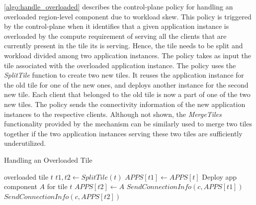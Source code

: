\cref{algo:handle_overloaded} describes the control-plane policy for handling an overloaded region-level component due to workload skew. This policy is triggered by the control-plane when it identifies that a given application instance is overloaded by the compute requirement of serving all the clients that are currently present in the tile its is serving. Hence, the tile needs to be split and workload divided among two application instances. The policy takes as input the tile associated with the overloaded application instance. The policy uses the \textit{SplitTile} function to create two new tiles. It reuses the application instance for the old tile for one of the new ones, and deploys another instance for the second new tile. Each client that belonged to the old tile is now a part of one of the two new tiles. The policy sends the connectivity information of the new application instances to the respective clients. Although not shown, the \textit{MergeTiles} functionality provided by the mechanism can be similarly used to merge two tiles together if the two application instances serving these two tiles are sufficiently underutilized.
\begin{algorithm}
\caption{Handling an Overloaded Tile}
\begin{algorithmic}
\Require overloaded tile $t$
\State $t1, t2 \gets SplitTile \left( t \right)$
\State $APPS \left[ t1 \right] \gets APPS \left[ t \right]$
\State Deploy app component $A$ for tile $t$
\State $APPS  \left[ t2 \right] \gets A$
    \State $SendConnectionInfo \left(c, APPS \left[ t1 \right] \right)$
\EndFor
{}
    \State $SendConnectionInfo \left(c, APPS \left[ t2 \right] \right)$
\EndFor
\end{algorithmic}
\label{algo:handle_overloaded}
\end{algorithm}

